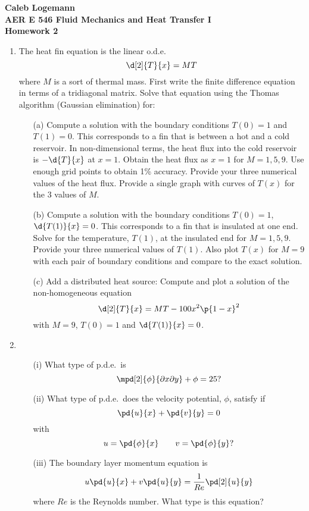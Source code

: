\documentclass[11pt, oneside]{article}
\begin{document}
\noindent \textbf{\Large{Caleb Logemann \\
AER E 546 Fluid Mechanics and Heat Transfer I \\
Homework 2
}}

%
\begin{enumerate}
  \item %
    The heat fin equation is the linear o.d.e.
    \[
      \d[2]{T}{x} = MT
    \]
    where $M$ is a sort of thermal mass.
    First write the finite difference equation in terms of a tridiagonal matrix.
    Solve that equation using the Thomas algorithm (Gaussian elimination) for:
    \begin{enumerate}
      \item[(a)]
        Compute a solution with the boundary conditions $T(0) = 1$ and
        $T(1) = 0$.
        This corresponds to a fin that is between a hot and a cold reservoir.
        In non-dimensional terms, the heat flux into the cold reservoir is
        $-\d{T}{x}$ at $x = 1$.
        Obtain the heat flux as $x = 1$ for $M = 1, 5, 9$. Use enough grid
        points to obtain 1\% accuracy.
        Provide your three numerical values of the heat flux.
        Provide a single graph with curves of $T(x)$ for the 3 values of $M$.



      \item[(b)]
        Compute a solution with the boundary conditions
        $T(0) = 1$, $\d{T(1)}{x} = 0$.
        This corresponds to a fin that is insulated at one end.
        Solve for the temperature, $T(1)$, at the insulated end for
        $M = 1, 5, 9$.
        Provide your three numerical values of $T(1)$.
        Also plot $T(x)$ for $M = 9$ with each pair of boundary conditions and
        compare to the exact solution.

      \item[(c)]
        Add a distributed heat source: Compute and plot a solution of the
        non-homogeneous equation
        \[
          \d[2]{T}{x} = MT - 100 x^2 \p{1 - x}^2
        \]
        with $M = 9$, $T(0) = 1$ and $\d{T(1)}{x} = 0$.
    \end{enumerate}

  \item %
    \begin{enumerate}
      \item[(i)]
        What type of p.d.e.\ is
        \[
          \mpd[2]{\phi}{\partial x \partial y} + \phi = 25?
        \]

      \item[(ii)]
        What type of p.d.e.\ does the velocity potential, $\phi$, satisfy if
        \[
          \pd{u}{x} + \pd{v}{y} = 0
        \]
        with
        \[
          u = \pd{\phi}{x} \qquad v = \pd{\phi}{y}?
        \]

      \item[(iii)]
        The boundary layer momentum equation is
        \[
          u \pd{u}{x} + v \pd{u}{y} = \frac{1}{Re} \pd[2]{u}{y}
        \]
        where $Re$ is the Reynolds number.
        What type is this equation?
    \end{enumerate}
\end{enumerate}
\end{document}
